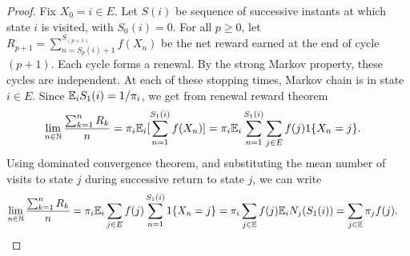 \documentclass[a4paper,10pt,english]{article}
\begin{document}
\begin{proof}
Fix $X_0 = i \in E$. 
Let $S(i)$ be sequence of successive instants at which state $i$ is visited, with $S_0(i) = 0$. 
For all $p \geq 0$,  let $R_{p+1} = \sum_{n = S_p(i) + 1}^{S_{(p + 1)}} f(X_n)$ be the net reward earned at the end of cycle $(p+1)$. 
Each cycle forms a renewal. 
By the strong Markov property, these cycles are independent. 
At each of these stopping times, Markov chain is in state $i \in E$. 
Since $\mathbb{E}_iS_1(i) = 1/\pi_i$, we get from renewal reward theorem %
\begin{align*}
\lim_{n \in \N}\frac{\sum_{k=1}^nR_k}{n} &= %
\pi_i\E_i[\sum_{n=1}^{S_1(i)}f(X_n)] = \pi_i\E_i\sum_{n=1}^{S_1(i)}\sum_{j \in E}f(j)1\{X_n = j\}.
\end{align*}
Using dominated convergence theorem, and substituting the mean number of visits to state $j$ during successive return to state $j$,  we can write 
\begin{align*}
\lim_{n \in \mathbb{N}}\frac{\sum_{k=1}^nR_k}{n} &= \pi_i\mathbb{E}_i\sum_{j \in E}f(j)\sum_{n=1}^{S_1(i)}1\{X_n = j\} = \pi_i\sum_{j \in \mathbb{E}}f(j)\mathbb{E}_iN_{j}(S_1(i))= \sum_{j \in \mathbb{E}}\pi_jf(j). 
\end{align*}

\end{proof}
\end{document}
